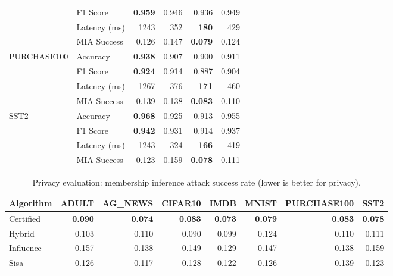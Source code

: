 \begin{table}[t]
\begin{tabular}{llrrrr}
 & F1 Score & \textbf{0.959} & 0.946 & 0.936 & 0.949 \\
 & Latency (ms) & 1243 & 352 & \textbf{180} & 429 \\
 & MIA Success & 0.126 & 0.147 & \textbf{0.079} & 0.124 \\
\midrule
PURCHASE100 & Accuracy & \textbf{0.938} & 0.907 & 0.900 & 0.911 \\
 & F1 Score & \textbf{0.924} & 0.914 & 0.887 & 0.904 \\
 & Latency (ms) & 1267 & 376 & \textbf{171} & 460 \\
 & MIA Success & 0.139 & 0.138 & \textbf{0.083} & 0.110 \\
\midrule
SST2 & Accuracy & \textbf{0.968} & 0.925 & 0.913 & 0.955 \\
 & F1 Score & \textbf{0.942} & 0.931 & 0.914 & 0.937 \\
 & Latency (ms) & 1243 & 324 & \textbf{166} & 419 \\
 & MIA Success & 0.123 & 0.159 & \textbf{0.078} & 0.111 \\
\midrule
\bottomrule
\end{tabular}
\end{table}

\begin{table}[t]
\centering
\caption{Privacy evaluation: membership inference attack success rate (lower is better for privacy).}
\label{tab:privacy}
\small
\begin{tabular}{lrrrrrrr}
\toprule
Algorithm & ADULT & AG\_NEWS & CIFAR10 & IMDB & MNIST & PURCHASE100 & SST2 \\
\midrule
Certified & \textbf{0.090} & \textbf{0.074} & \textbf{0.083} & \textbf{0.073} & \textbf{0.079} & \textbf{0.083} & \textbf{0.078} \\
Hybrid & 0.103 & 0.110 & 0.090 & 0.099 & 0.124 & 0.110 & 0.111 \\
Influence & 0.157 & 0.138 & 0.149 & 0.129 & 0.147 & 0.138 & 0.159 \\
Sisa & 0.126 & 0.117 & 0.128 & 0.122 & 0.126 & 0.139 & 0.123 \\
\bottomrule
\end{tabular}
\end{table}
